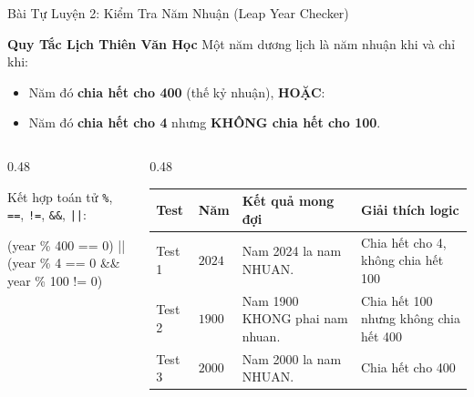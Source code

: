 \documentclass[aspectratio=169, 10pt]{beamer}
\begin{document}
\begin{frame}{Bài Tự Luyện 2: Kiểm Tra Năm Nhuận (Leap Year Checker)}
  \begin{block}{\textbf{Quy Tắc Lịch Thiên Văn Học}}
    Một năm dương lịch là năm nhuận khi và chỉ khi:
    \begin{itemize}
      \item Năm đó \textbf{chia hết cho 400} (thế kỷ nhuận), \textbf{HOẶC}:
      \item Năm đó \textbf{chia hết cho 4} nhưng \textbf{KHÔNG chia hết cho 100}.
    \end{itemize}
  \end{block}
  \begin{columns}[T]
    \begin{column}{0.48\textwidth}
      \begin{tcolorbox}[colback=UniLightBlue!30,colframe=UniBlue,title=\textbf{Biểu Thức Logic C\#}]
        Kết hợp toán tử \texttt{\%}, \texttt{==}, \texttt{!=}, \texttt{\&\&}, \texttt{||}:
        \begin{center}
          \ttfamily
          (year \% 400 == 0) || \\
          (year \% 4 == 0 \&\& year \% 100 != 0)
        \end{center}
      \end{tcolorbox}
    \end{column}
    \begin{column}{0.48\textwidth}
      \begin{table}[h]
        \centering
        \scriptsize
        \begin{tabularx}{\textwidth}{lp{1.2cm}p{2.5cm}X}
          \toprule
          \textbf{Test} & \textbf{Năm} & \textbf{Kết quả mong đợi} & \textbf{Giải thích logic} \\
          \midrule
          Test 1 & $2024$ & Nam 2024 la nam NHUAN. & Chia hết cho 4, không chia hết 100 \\
          \addlinespace
          Test 2 & $1900$ & Nam 1900 KHONG phai nam nhuan. & Chia hết 100 nhưng không chia hết 400 \\
          \addlinespace
          Test 3 & $2000$ & Nam 2000 la nam NHUAN. & Chia hết cho 400 \\
          \bottomrule
        \end{tabularx}
      \end{table}
    \end{column}
  \end{columns}
\end{frame}
\end{document}
